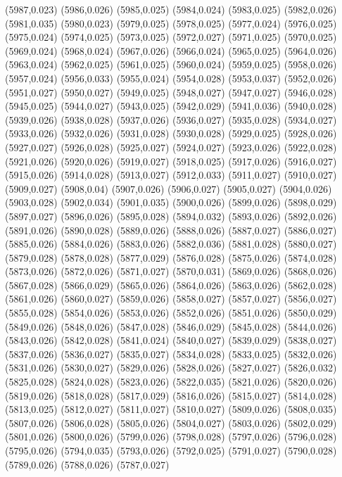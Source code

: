 (5987,0.023)
(5986,0.026)
(5985,0.025)
(5984,0.024)
(5983,0.025)
(5982,0.026)
(5981,0.035)
(5980,0.023)
(5979,0.025)
(5978,0.025)
(5977,0.024)
(5976,0.025)
(5975,0.024)
(5974,0.025)
(5973,0.025)
(5972,0.027)
(5971,0.025)
(5970,0.025)
(5969,0.024)
(5968,0.024)
(5967,0.026)
(5966,0.024)
(5965,0.025)
(5964,0.026)
(5963,0.024)
(5962,0.025)
(5961,0.025)
(5960,0.024)
(5959,0.025)
(5958,0.026)
(5957,0.024)
(5956,0.033)
(5955,0.024)
(5954,0.028)
(5953,0.037)
(5952,0.026)
(5951,0.027)
(5950,0.027)
(5949,0.025)
(5948,0.027)
(5947,0.027)
(5946,0.028)
(5945,0.025)
(5944,0.027)
(5943,0.025)
(5942,0.029)
(5941,0.036)
(5940,0.028)
(5939,0.026)
(5938,0.028)
(5937,0.026)
(5936,0.027)
(5935,0.028)
(5934,0.027)
(5933,0.026)
(5932,0.026)
(5931,0.028)
(5930,0.028)
(5929,0.025)
(5928,0.026)
(5927,0.027)
(5926,0.028)
(5925,0.027)
(5924,0.027)
(5923,0.026)
(5922,0.028)
(5921,0.026)
(5920,0.026)
(5919,0.027)
(5918,0.025)
(5917,0.026)
(5916,0.027)
(5915,0.026)
(5914,0.028)
(5913,0.027)
(5912,0.033)
(5911,0.027)
(5910,0.027)
(5909,0.027)
(5908,0.04)
(5907,0.026)
(5906,0.027)
(5905,0.027)
(5904,0.026)
(5903,0.028)
(5902,0.034)
(5901,0.035)
(5900,0.026)
(5899,0.026)
(5898,0.029)
(5897,0.027)
(5896,0.026)
(5895,0.028)
(5894,0.032)
(5893,0.026)
(5892,0.026)
(5891,0.026)
(5890,0.028)
(5889,0.026)
(5888,0.026)
(5887,0.027)
(5886,0.027)
(5885,0.026)
(5884,0.026)
(5883,0.026)
(5882,0.036)
(5881,0.028)
(5880,0.027)
(5879,0.028)
(5878,0.028)
(5877,0.029)
(5876,0.028)
(5875,0.026)
(5874,0.028)
(5873,0.026)
(5872,0.026)
(5871,0.027)
(5870,0.031)
(5869,0.026)
(5868,0.026)
(5867,0.028)
(5866,0.029)
(5865,0.026)
(5864,0.026)
(5863,0.026)
(5862,0.028)
(5861,0.026)
(5860,0.027)
(5859,0.026)
(5858,0.027)
(5857,0.027)
(5856,0.027)
(5855,0.028)
(5854,0.026)
(5853,0.026)
(5852,0.026)
(5851,0.026)
(5850,0.029)
(5849,0.026)
(5848,0.026)
(5847,0.028)
(5846,0.029)
(5845,0.028)
(5844,0.026)
(5843,0.026)
(5842,0.028)
(5841,0.024)
(5840,0.027)
(5839,0.029)
(5838,0.027)
(5837,0.026)
(5836,0.027)
(5835,0.027)
(5834,0.028)
(5833,0.025)
(5832,0.026)
(5831,0.026)
(5830,0.027)
(5829,0.026)
(5828,0.026)
(5827,0.027)
(5826,0.032)
(5825,0.028)
(5824,0.028)
(5823,0.026)
(5822,0.035)
(5821,0.026)
(5820,0.026)
(5819,0.026)
(5818,0.028)
(5817,0.029)
(5816,0.026)
(5815,0.027)
(5814,0.028)
(5813,0.025)
(5812,0.027)
(5811,0.027)
(5810,0.027)
(5809,0.026)
(5808,0.035)
(5807,0.026)
(5806,0.028)
(5805,0.026)
(5804,0.027)
(5803,0.026)
(5802,0.029)
(5801,0.026)
(5800,0.026)
(5799,0.026)
(5798,0.028)
(5797,0.026)
(5796,0.028)
(5795,0.026)
(5794,0.035)
(5793,0.026)
(5792,0.025)
(5791,0.027)
(5790,0.028)
(5789,0.026)
(5788,0.026)
(5787,0.027)
